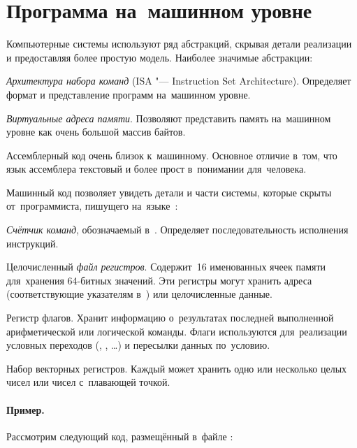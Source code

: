 \section{Программа на~машинном уровне}
Компьютерные системы используют ряд абстракций, скрывая детали реализации и предоставляя более простую модель. Наиболее значимые абстракции:

\begin{itemfeature}
  \item \emph{Архитектура набора команд} (ISA "--- \textenglish{Instruction Set Architecture}). Определяет формат и представление программ на~машинном уровне.

  \item \emph{Виртуальные адреса памяти}. Позволяют представить память на~машинном уровне как очень большой массив байтов.
\end{itemfeature}

Ассемблерный код очень близок к~машинному. Основное отличие в~том, что язык ассемблера текстовый и более прост в~понимании для~человека.

Машинный код позволяет увидеть детали и части системы, которые скрыты от~программиста, пишущего на~языке~:

\begin{itemfeature}
  \item \emph{Счётчик команд}, обозначаемый  в~. Определяет последовательность исполнения инструкций.

  \item Целочисленный \emph{файл регистров}. Содержит~16 именованных ячеек памяти для~хранения 64-битных значений. Эти регистры могут хранить адреса (соответствующие указателям в~) или целочисленные данные.

  \item Регистр флагов. Хранит информацию о~результатах последней выполненной арифметической или логической команды. Флаги используются для~реализации условных переходов (, , \ldots) и пересылки данных по~условию.

  \item Набор векторных регистров. Каждый может хранить одно или несколько целых чисел или чисел с~плавающей точкой.
\end{itemfeature}



\paragraph{Пример.} Рассмотрим следующий код, размещённый в~файле :

